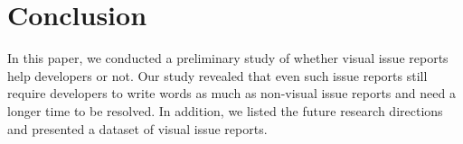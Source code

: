 \section{Conclusion}
\label{sec:conclusion}


In this paper, we conducted a preliminary study of 
whether visual issue reports help developers or not. 
Our study revealed that even such issue reports still 
require developers to write words as much as non-visual issue reports 
and need a longer time to be resolved. 
In addition, we listed the future research directions and 
presented a dataset of visual issue reports. 
